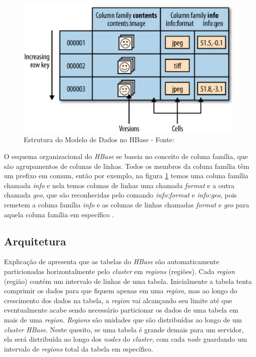             \begin{figure}[ht!]
                        \centering
                        \includegraphics[keepaspectratio=true,scale=0.5]
                            {figuras/figura10.eps}
                        \caption[Estrutura do Modelo de Dados no HBase]{Estrutura do Modelo de Dados no HBase -
                        \protect Fonte: }
                        \label{figura10}
            \end{figure}

            O esquema organizacional do \textit{HBase} se baseia no conceito de coluna família, que são agrupamentos de colunas
            de linhas. Todos os membros da coluna família têm um prefixo em comum, então por exemplo, na figura \ref{figura10}
            temos uma coluna família chamada \textit{info} e nela temos colunas de linhas uma chamada \textit{format} e a outra
            chamada \textit{geo}, que são reconhecidas pelo comando \textit{info:format} e \textit{info:geo}, pois remetem a coluna
            família \textit{info} e as colunas de linhas chamadas \textit{format} e \textit{geo} para aquela coluna família em específico
            \cite{white2015}.

        \subsection{Arquitetura}

            Explicação de  apresenta que as tabelas do \textit{HBase} são automaticamente particionadas
            horizontalmente pelo \textit{cluster} em \textit{regions} (regiões). Cada \textit{region} (região) contém um intervalo
            de linhas de uma tabela. Inicialmente a tabela tenta comprimir os dados para que fiquem apenas em uma \textit{region},
            mas ao longo do crescimento dos dados na tabela, a \textit{region} vai alcançando seu limite até que eventualmente
            acabe sendo necessário particionar os dados de uma tabela em mais de uma \textit{region}. \textit{Regions} são
            unidades que são distribuídas ao longo de um \textit{cluster HBase}. Neste quesito, se uma tabela é grande demais
            para um servidor, ela será distribuída ao longo dos \textit{nodes} do \textit{cluster}, com cada \textit{node} guardando
            um intervalo de \textit{regions} total da tabela em específico.


